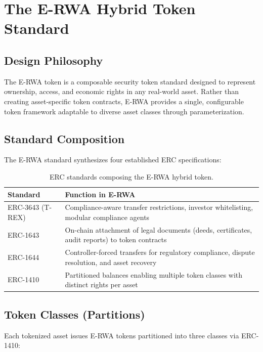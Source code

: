 \documentclass[11pt,a4paper]{article}
\begin{document}
\section{The E-RWA Hybrid Token Standard}
\label{sec:erwa}

\subsection{Design Philosophy}

The E-RWA token is a composable security token standard designed to represent ownership, access, and economic rights in any real-world asset. Rather than creating asset-specific token contracts, E-RWA provides a single, configurable token framework adaptable to diverse asset classes through parameterization.

\subsection{Standard Composition}

The E-RWA standard synthesizes four established ERC specifications:

\begin{table}[H]
\centering
\caption{ERC standards composing the E-RWA hybrid token.}
\label{tab:erc-composition}
\begin{tabularx}{\textwidth}{lX}
\toprule
\textbf{Standard} & \textbf{Function in E-RWA} \\
\midrule
ERC-3643 (T-REX) & Compliance-aware transfer restrictions, investor whitelisting, modular compliance agents \\
ERC-1643 & On-chain attachment of legal documents (deeds, certificates, audit reports) to token contracts \\
ERC-1644 & Controller-forced transfers for regulatory compliance, dispute resolution, and asset recovery \\
ERC-1410 & Partitioned balances enabling multiple token classes with distinct rights per asset \\
\bottomrule
\end{tabularx}
\end{table}

\subsection{Token Classes (Partitions)}

Each tokenized asset issues E-RWA tokens partitioned into three classes via ERC-1410:
\end{document}

